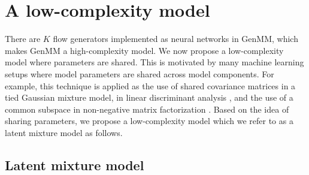 \section{A low-complexity model}
There are $K$ flow generators implemented as neural networks in GenMM, which makes GenMM a high-complexity model.
We now propose a low-complexity model where parameters are shared. This is motivated by many machine learning setups where model parameters are shared across model components. For example, this technique is applied as the use of shared covariance matrices in a tied Gaussian mixture model, in linear discriminant analysis \cite{bellegarda1990tiedmixture, Kimball:1993:UTD:1075671.1075694, Bishop:2006:PRM:1162264}, and the use of a common subspace in non-negative matrix factorization \cite{Gupta2013}. Based on the idea of sharing parameters, we propose a low-complexity model which we refer to as a latent mixture model as follows.

\subsection{Latent mixture model}\label{subsec-latmm}

